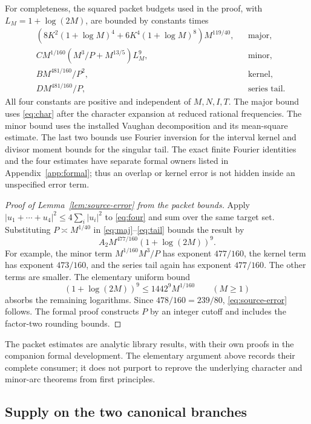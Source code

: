 \documentclass[11pt]{article}
\theoremstyle{definition}
\theoremstyle{remark}
\begin{document}
For completeness, the squared packet budgets used in the proof, with
\(L_M=1+\log(2M)\), are bounded by constants times
\begin{align}
 &(8K^2(1+\log M)^4+6K^4(1+\log M)^8)M^{119/40},
                                      &&\text{major},\label{eq:maj}\\
 &C M^{1/160}(M^3/P+M^{13/5})L_M^9,
                                      &&\text{minor},\label{eq:min}\\
 &B M^{481/160}/P^2,                   &&\text{kernel},\label{eq:ker}\\
 &D M^{481/160}/P,                     &&\text{series tail}.\label{eq:tail}
\end{align}
All four constants are positive and independent of \(M,N,I,T\).
The major bound uses \eqref{eq:char} after the character expansion at
reduced rational frequencies. The minor bound uses the installed
Vaughan decomposition and its mean-square estimate. The last two
bounds use Fourier inversion for the interval kernel and divisor
moment bounds for the singular tail. The exact finite Fourier
identities and the four estimates have separate formal owners listed
in Appendix~\ref{app:formal}; thus an overlap or kernel error is not
hidden inside an unspecified error term.

\begin{proof}[Proof of Lemma~\ref{lem:source-error} from the packet bounds]
Apply \(|u_1+\cdots+u_4|^2\le4\sum_i|u_i|^2\) to
\eqref{eq:four} and sum over the same target set.
Substituting \(P\asymp M^{1/40}\) in \eqref{eq:maj}--\eqref{eq:tail}
bounds the result by
\[
 A_2 M^{477/160}(1+\log(2M))^9.
\]
For example, the minor term \(M^{1/160}M^3/P\) has exponent
\(477/160\), the kernel term has exponent \(473/160\), and the series
tail again has exponent \(477/160\). The other terms are smaller.
The elementary uniform bound
\[
 (1+\log(2M))^9\le1442^9 M^{1/160}\qquad(M\ge1)
\]
absorbs the remaining logarithms. Since \(478/160=239/80\),
\eqref{eq:source-error} follows. The formal proof constructs \(P\)
by an integer cutoff and includes the factor-two rounding bounds.
\end{proof}

The packet estimates are analytic library results, with their own proofs
in the companion formal development. The elementary argument above
records their complete consumer; it does not purport to reprove the
underlying character and minor-arc theorems from first principles.

\subsection{Supply on the two canonical branches}
\end{document}
